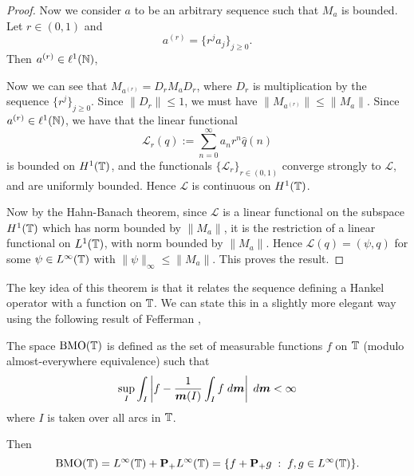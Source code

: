 \documentclass{unswmaths}
\begin{document}
\begin{proof}
    Now we consider $a$ to be an arbitrary sequence such that $M_a$ is bounded. Let $r \in (0,1)$
    and
    \begin{equation*}
        a^{(r)} = \{r^ja_j\}_{j\geq 0}.
    \end{equation*}
    Then $a^{(r)} \in \ell^1(\mathbb{N})$,
    
    Now we can see that $M_{a^{(r)}} = D_r M_a D_r$, where $D_r$
    is multiplication by the sequence $\{r^j\}_{j\geq 0}$. Since $\|D_r\| \leq 1$, 
    we must have $\|M_{a^{(r)}}\| \leq \|M_a\|$. Since $a^{(r)} \in \ell^1(\mathbb{N})$, 
    we have that the linear functional
    \begin{equation*}
        \mathcal{L}_r(q) := \sum_{n=0}^\infty a_nr^n \hat{q}(n)
    \end{equation*}
    is bounded on $H^1(\mathbb{T})$, and the functionals $\{\mathcal{L}_r\}_{r \in (0,1)}$
    converge strongly to $\mathcal{L}$, and are uniformly bounded. Hence $\mathcal{L}$
    is continuous on $H^1(\mathbb{T})$. 
    
    Now by the Hahn-Banach theorem, since $\mathcal{L}$ is a linear
    functional on the subspace $H^1(\mathbb{T})$ which has norm bounded
    by $\|M_a\|$, it is the restriction
    of a linear functional on $L^1(\mathbb{T})$, with norm bounded by $\|M_a\|$.
    Hence $\mathcal{L}(q) = (\psi,q)$ for some $\psi \in L^\infty(\mathbb{T})$
    with $\|\psi\|_\infty \leq \|M_a\|$. This proves the result.    
\end{proof}

The key idea of this theorem is that it relates the sequence defining
a Hankel operator with a function on $\mathbb{T}$. We can state this in a slightly more
elegant way using the following result of Fefferman \cite{fefferman},
\begin{proposition}
    The space $\operatorname{BMO}(\mathbb{T})$ is defined as the set of measurable
    functions $f$ on $\mathbb{T}$ (modulo almost-everywhere equivalence) such that
    \begin{equation*}
        \sup_I \int_I \left|f-\frac{1}{\boldsymbol{m}(I)}\int_I f\;d\boldsymbol{m}\right|\;d\boldsymbol{m} < \infty
    \end{equation*}
    where $I$ is taken over all arcs in $\mathbb{T}$.
    
    Then 
    \begin{equation*}
        \operatorname{BMO}(\mathbb{T}) = L^\infty(\mathbb{T})+\mathbf{P}_+L^\infty(\mathbb{T}) = \{f+\mathbf{P}_+g\;:\;f,g \in L^\infty(\mathbb{T})\}.
    \end{equation*}
\end{proposition}
\end{document}
